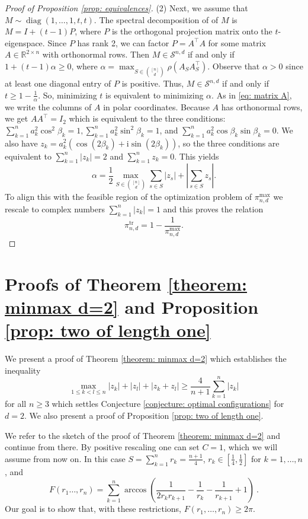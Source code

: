 \documentclass[reqno,hidelinks,11pt]{amsart}
\numberwithin{equation}{section}
\def\RR{\mathbb{R}}
\def\diag{\operatorname{diag}}
\def\S{\mathcal{S}}
\def\tr{\operatorname{tr}}
\begin{document}
\begin{proof}[Proof of Proposition \ref{prop: equivalences}]
(2) Next, we assume that $M \sim \diag(1,\ldots,1,t,t)$. The spectral decomposition of of $M$ is $M=I+(t-1)P$, where $P$ is the orthogonal projection matrix onto the $t$-eigenspace. Since $P$ has rank 2, we can factor $P=A^\top A$ for some matrix $A \in \RR^{2 \times n}$ with orthonormal rows. Then $M \in \S^{n,d}$ if and only if  $1+(t-1)\alpha \geq 0$, where $\alpha = \max_{S \in \binom{[n]}{d}}\rho(A_SA_S^\top)$. Observe that $\alpha > 0$ since at least one diagonal entry of $P$ is positive. Thus, $M \in \S^{n,d}$ if and only if $t \geq 1- \frac{1}{\alpha}$. So, minimizing $t$ is equivalent to minimizing $\alpha$. 
    As in \eqref{eq: matrix A}, we write the columns of $A$ in polar coordinates. Because $A$ has orthonormal rows, we get $AA^\top = I_2$ which is equivalent to the three conditions: $\sum_{k=1}^n a_k^2 \cos^2 \beta_k = 1, \sum_{k=1}^n a_k^2 \sin^2 \beta_k =1$, and $\sum_{k=1}^n a_k^2 \cos\beta_k \sin \beta_k = 0$. We also have $z_k = a_k^2(\cos (2\beta_k) + \mathrm{i} \sin (2\beta_k))$, so 
    the three conditions are equivalent to $\sum_{k=1}^n |z_k| =2$ and $\sum_{k=1}^n z_k = 0$. This yields
    \[ \alpha = \frac{1}{2}\max_{S\in\binom{[n]}d} \sum_{s\in S}|z_s|+\left|\sum_{s\in S} z_s\right|. \] To align this with the feasible region of the optimization problem of $\pi_{n,d}^{\max}$ we rescale to complex numbers $\sum_{k=1}^n |z_k|=1$ and this proves the relation
    \[ \pi_{n,d}^{\tr} = 1- \frac{1}{\pi_{n,d}^{\max}}.\]

\end{proof}

\section{Proofs of Theorem \ref{theorem: minmax d=2} and Proposition \ref{prop: two of length one}}\label{sec:appendixC}
We present a proof of Theorem \ref{theorem: minmax d=2} which establishes the inequality
    \[
        \max_{1\le k<l\le n}|z_k|+|z_l|+|z_k+z_l|\ge\frac4{n+1}\sum_{k=1}^n|z_k|
    \]
    for all $n \geq 3$ which settles Conjecture \ref{conjecture: optimal configurations} for $d=2$. We also present a proof of Proposition \ref{prop: two of length one}.

We refer to the sketch of the proof of Theorem \ref{theorem: minmax d=2} and continue from there. By positive rescaling one can set $C=1$, which we will assume from now on. In this case $S=\sum_{k=1}^n r_k=\frac{n+1}4$, $r_k\in[\frac14,\frac12]$ for $k=1,\dots,n$, and 
\[
F(r_1\dots,r_n)=\sum_{k=1}^n\arccos\left(\frac{1}{2r_kr_{k+1}}-\frac{1}{r_k}-\frac{1}{r_{k+1}}+1\right)~.
\]
Our goal is to show that, with these restrictions, $F(r_1,\dots,r_n)\ge2\pi$. 
\end{document}
